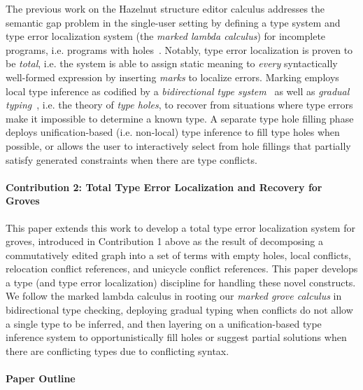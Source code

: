 The previous work on the Hazelnut structure editor calculus addresses the semantic gap problem in the single-user setting by 
defining a type system and type error localization system (the \emph{marked lambda calculus}) for incomplete programs, i.e. programs with holes~\cite{DBLP:journals/pacmpl/ZhaoMDBPO24}. 
Notably, type error localization is proven to be \emph{total}, i.e. the system is able to assign static meaning to \emph{every} syntactically well-formed expression by inserting \emph{marks} to localize errors. Marking employs local type inference as codified by a \emph{bidirectional type system}~\cite{dunfield2019} as well as \emph{gradual typing}~\cite{siek2015}, i.e. the theory of \emph{type holes}, to recover from situations where type errors make it impossible to 
determine a known type. 
A separate type hole filling phase deploys unification-based (i.e. non-local) type inference to fill type holes when possible, 
or allows the user to interactively select from hole fillings that partially satisfy generated constraints when there are type conflicts.


\paragraph{Contribution 2: Total Type Error Localization and Recovery for Groves}

This paper extends this work to develop a total type error localization system for groves, introduced in Contribution 1 above as the result of decomposing a commutatively edited graph into a set of terms with empty holes, local conflicts, relocation conflict references, and unicycle conflict references. This paper develops a type (and type error localization) discipline for handling these novel constructs. We follow the marked lambda calculus in rooting our \emph{marked grove calculus} in bidirectional type checking, deploying gradual typing when conflicts do not allow a single type to be inferred, and then layering on a unification-based type inference system to opportunistically fill holes or suggest partial solutions when there are conflicting types due to conflicting syntax.

\paragraph{Paper Outline}

